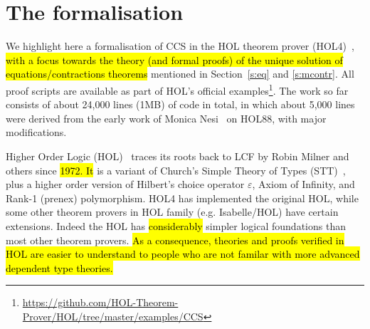 
\newcommand\fun{{\to}}
\newcommand\prd{{\times}}
\newcommand{\ty}[1]{\textsl{#1}}
\newcommand\conj{\ \wedge\ }
\newcommand\disj{\ \vee\ }
\newcommand\imp{ \Rightarrow }
\newcommand\eqv{\ \equiv\ }
\newcommand\vbar{\mid}
\newcommand\turn{\ \vdash\ } %
\newcommand\hilbert{\varepsilon}
\newcommand{\uquant}[1]{\forall #1.\ }
\newcommand{\equant}[1]{\exists #1.\ }
\newcommand{\hquant}[1]{\hilbert #1.\ }
\newcommand{\iquant}[1]{\exists ! #1.\ }
\newcommand{\lquant}[1]{\lambda #1.\ }
\newcommand{\ml}[1]{\mbox{{\def\_{\char'137}\texttt{#1}}}}
\newcommand{\con}[1]{\mathrm{#1}}

\newcommand\bool{\ty{bool}}
\newcommand\num{\ty{num}}
\newcommand\ind{\ty{ind}}
\newcommand\lst{\ty{list}}

\providecommand{\T}{\con{T}}
\renewcommand{\T}{\con{T}}
\newcommand\F{\con{F}}
\newcommand\OneOne{\con{One\_One}}
\newcommand\OntoSubset{\con{Onto\_Subset}}
\newcommand\Onto{\con{Onto}}
\newcommand\TyDef{\con{Type\_Definition}}

\section{The formalisation}
\label{s:for}

We highlight here a formalisation of CCS in the HOL theorem prover
(HOL4)~\cite{Melham:1993vl,slind2008brief}, \hl{with a focus towards the
theory (and formal proofs) of the unique solution of
equations/contractions theorems} mentioned in Section~\ref{s:eq} and
\ref{s:mcontr}.
All proof scripts are available as part of HOL's official
examples\footnote{\url{https://github.com/HOL-Theorem-Prover/HOL/tree/master/examples/CCS}}.
The work so far consists of about 24,000 lines (1MB) of code in total,
in which about 5,000 lines were derived from the early work of Monica
Nesi~\cite{Nesi:1992ve} on HOL88, with major modifications.

Higher Order Logic (HOL)~\cite{hollogic} traces
its roots back to LCF
\cite{gordon1979edinburgh,milner1972logic} by Robin Milner and others
since \hl{1972. It} is a variant of
Church’s Simple Theory of Types (STT)~\cite{church1940formulation},
plus a higher order version of Hilbert's choice operator $\varepsilon$,
Axiom of Infinity, and Rank-1 (prenex) polymorphism.
HOL4 has implemented the original HOL, 
while some other theorem provers in HOL family (e.g. Isabelle/HOL) have
certain extensions.
Indeed the HOL has \hl{considerably} simpler logical
foundations than most other theorem provers. %
\hl{As a consequence, theories and proofs verified in HOL are easier to understand
 to people who are not familar with more advanced
dependent type theories.}


